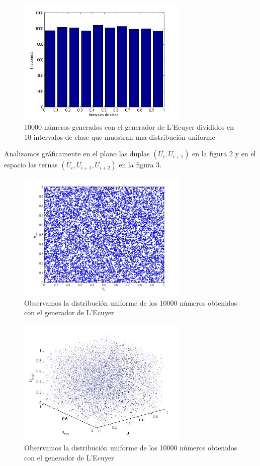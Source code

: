 \documentclass[10pt,journal,compsoc]{IEEEtran}
\begin{document}
\begin{figure}[t]
\label{fig:histogramalecuyer}
\begin{center}
\centering
\includegraphics[width=3.2in]{clases.jpg}
\caption{10000 n\'umeros generados con el generador de L'Ecuyer divididos en 10 intervalos de clase que muestran una distribuci\'on uniforme}
\end{center}
\end{figure}

Analizamos gr\'aficamente en el plano las duplas $(U_i, U_{i+1})$ en la figura 2 y en el espacio las ternas $(U_i, U_{i+1}, U_{i+2})$ en la figura 3.

\begin{figure}[t]
\label{fig:2d}
\begin{center}
\centering
\includegraphics[width=3.2in]{2d.jpg}
\caption{Observamos la distribuci\'on uniforme de los 10000 n\'umeros obtenidos con el generador de L'Ecuyer}
\end{center}
\end{figure}

\begin{figure}[t]
\label{fig:3d}
\begin{center}
\centering
\includegraphics[width=3.2in]{3d.jpg}
\caption{Observamos la distribuci\'on uniforme de los 10000 n\'umeros obtenidos con el generador de L'Ecuyer}
\end{center}
\end{figure}
\end{document}
